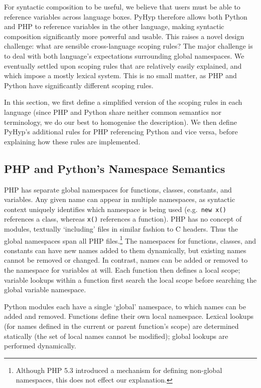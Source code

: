 \documentclass[a4paper,UKenglish]{lipics-v2016}
\newcommand{\ourvm}{PyHyp\xspace}
\begin{document}
{{For syntactic composition to be useful, we believe that users must be able to
reference variables across language boxes. \ourvm therefore allows both Python
and PHP to reference variables in the other language, making syntactic
composition significantly more powerful and usable. This raises a novel design
challenge: what are sensible cross-language scoping rules? The major
challenge is to deal with both language's expectations surrounding global
namespaces. We eventually settled upon scoping rules that are relatively easily explained, and which
impose a mostly lexical system. This is no small matter, as PHP
and Python have significantly different scoping rules.

In this section, we first define a simplified version of the scoping rules in
each language (since PHP and Python share neither common
semantics nor terminology, we do our best to homogenise the description).
We then define \ourvm's additional rules for PHP referencing Python
and vice versa, before explaining how these rules are implemented.


\subsection{PHP and Python's Namespace Semantics}
\label{scope:php namespace semantics}

PHP has separate global namespaces for functions, classes, constants, and variables.
Any given name can appear in multiple namespaces, as syntactic
context uniquely identifies which namespace is being used
(e.g.~\texttt{new x()} references a class, whereas
\texttt{x()} references a function). PHP has no concept of modules,
textually `including' files in similar fashion to C headers. Thus the
global namespaces span all PHP files.\footnote{Although PHP 5.3 introduced a
mechanism for defining non-global namespaces, this does not effect our explanation.}
The namespaces for functions, classes, and constants can have new names added to
them dynamically, but existing names cannot be removed or changed. In contrast,
names can be added or removed to the namespace for variables
at will. Each function then defines a local scope; variable lookups within a
function first search the local scope before searching the global variable
namespace.

Python modules each have a single `global' namespace, to which names can be
added and removed. Functions define their own local namespace. Lexical
lookups (for names defined in the current or parent function's scope)
are determined statically (the set of local names cannot be
modified); global lookups are performed dynamically.

}}
\end{document}
